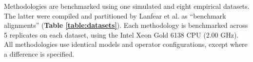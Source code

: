 \documentclass[10pt,letterpaper]{article}
\begin{document}



Methodologies are benchmarked using one simulated and eight empirical datasets.
The latter were compiled \cite{lanfear2019Github} and partitioned \cite{lanfear2016partitionfinder} by Lanfear et al. as ``benchmark alignments'' (\textbf{Table \ref{table:datasets}}).
Each methodology is benchmarked across 5 replicates on each dataset, using the Intel Xeon Gold 6138 CPU (2.00 GHz).
All methodologies use identical models and operator configurations, except where a difference is specified.


\end{document}
